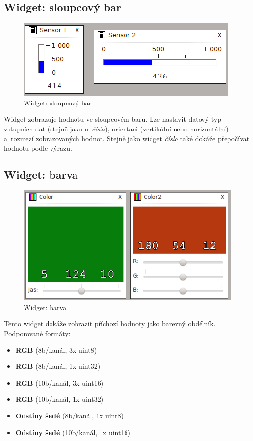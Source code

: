 \documentclass[12pt, a4paper, oneside]{article}
\newcommand{\It}{\textit}  %
\begin{document}
\subsection{Widget: sloupcový bar}
\begin{figure}[H]
\begin{center}
\includegraphics{img/w_bar.png}
\caption{Widget: sloupcový bar}
\end{center}
\end{figure}
Widget zobrazuje hodnotu ve sloupcovém baru. Lze nastavit datový typ vstupních dat (stejně jako u~\It{čísla}), orientaci (vertikální nebo horizontální) a~rozmezí zobrazovaných hodnot. Stejně jako widget \It{číslo} také dokáže přepočívat hodnotu podle výrazu.

\subsection{Widget: barva}
\begin{figure}[H]
\begin{center}
\includegraphics{img/w_col.png}
\caption{Widget: barva}
\end{center}
\end{figure}
Tento widget dokáže zobrazit příchozí hodnoty jako barevný obdélník. Podporované formáty:
\begin{itemize}
    \item {\bf RGB} (8b/kanál, 3x uint8)
    \item {\bf RGB} (8b/kanál, 1x uint32)
    \item {\bf RGB} (10b/kanál, 3x uint16)
    \item {\bf RGB} (10b/kanál, 1x uint32)
    \item {\bf Odstíny šedé} (8b/kanál, 1x uint8)
    \item {\bf Odstíny šedé} (10b/kanál, 1x uint16)
\end{itemize}
\end{document}

